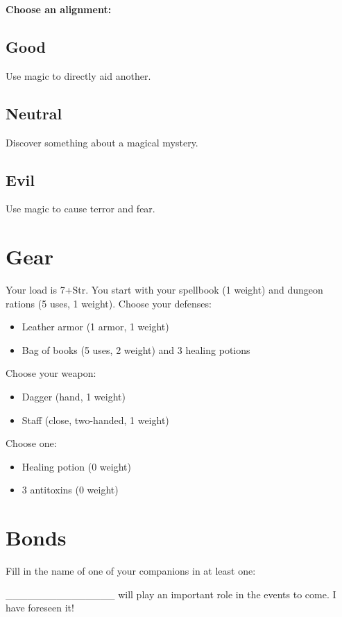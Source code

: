 {\bfseries Choose an alignment:}
\subsection{Good}


 Use magic to directly aid another.
\subsection{Neutral}


 Discover something about a magical mystery.
\subsection{Evil}


 Use magic to cause terror and fear.
\section*{Gear}


 Your load is 7+Str. You start with your spellbook (1 weight) and dungeon rations (5 uses, 1 weight). Choose your defenses:
\begin{itemize}
\item Leather armor (1 armor, 1 weight)
\item Bag of books (5 uses, 2 weight) and 3 healing potions

\end{itemize}


 Choose your weapon:
\begin{itemize}
\item Dagger (hand, 1 weight)
\item Staff (close, two-handed, 1 weight)

\end{itemize}


 Choose one:
\begin{itemize}
\item Healing potion (0 weight)
\item 3 antitoxins (0 weight)

\end{itemize}
\section*{Bonds}


 Fill in the name of one of your companions in at least one:


 \_\_\_\_\_\_\_\_\_\_\_\_\_\_\_ will play an important role in the events to come. I have foreseen it!


